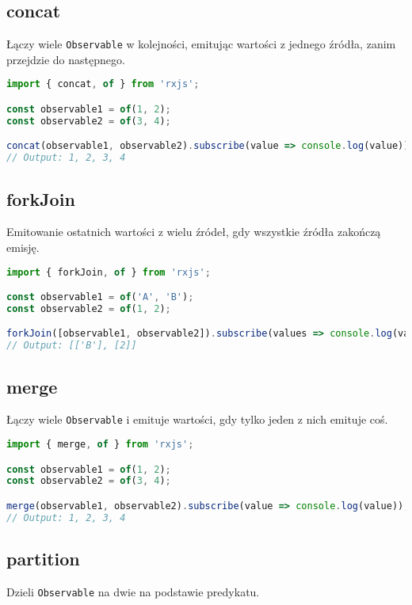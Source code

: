 \documentclass[a4paper,12pt]{article}
\begin{document}
\subsection{concat}
Łączy wiele \texttt{Observable} w kolejności, emitując wartości z jednego źródła, zanim przejdzie do następnego.

\begin{lstlisting}[language=JavaScript, caption=Przykład użycia \texttt{concat}]
import { concat, of } from 'rxjs';

const observable1 = of(1, 2);
const observable2 = of(3, 4);

concat(observable1, observable2).subscribe(value => console.log(value));
// Output: 1, 2, 3, 4
\end{lstlisting}

\subsection{forkJoin}
Emitowanie ostatnich wartości z wielu źródeł, gdy wszystkie źródła zakończą emisję.

\begin{lstlisting}[language=JavaScript, caption=Przykład użycia \texttt{forkJoin}]
import { forkJoin, of } from 'rxjs';

const observable1 = of('A', 'B');
const observable2 = of(1, 2);

forkJoin([observable1, observable2]).subscribe(values => console.log(values));
// Output: [['B'], [2]]
\end{lstlisting}

\subsection{merge}
Łączy wiele \texttt{Observable} i emituje wartości, gdy tylko jeden z nich emituje coś.

\begin{lstlisting}[language=JavaScript, caption=Przykład użycia \texttt{merge}]
import { merge, of } from 'rxjs';

const observable1 = of(1, 2);
const observable2 = of(3, 4);

merge(observable1, observable2).subscribe(value => console.log(value));
// Output: 1, 2, 3, 4
\end{lstlisting}

\subsection{partition}
Dzieli \texttt{Observable} na dwie na podstawie predykatu.
\end{document}
